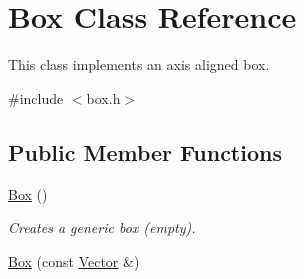 \hypertarget{class_box}{
\section{Box Class Reference}
\label{class_box}
}


This class implements an axis aligned box.  




{\ttfamily \#include $<$box.h$>$}

\subsection*{Public Member Functions}
\begin{DoxyCompactItemize}
\item 
\hypertarget{class_box_aca78d7db44972bfa78d46b7bbc8796f6}{
\hyperlink{class_box_aca78d7db44972bfa78d46b7bbc8796f6}{Box} ()}
\label{class_box_aca78d7db44972bfa78d46b7bbc8796f6}

\begin{DoxyCompactList}\small\item\em Creates a generic box (empty). \item\end{DoxyCompactList}\item 
\hypertarget{class_box_ab4a2a18916c428de651b22cdf280bf3e}{
\hyperlink{class_box_ab4a2a18916c428de651b22cdf280bf3e}{Box} (const \hyperlink{class_vector}{Vector} \&)}
\label{class_box_ab4a2a18916c428de651b22cdf280bf3e}


\end{DoxyCompactItemize}
